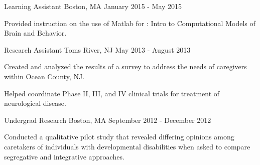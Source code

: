 \begin{cventries}
    {Learning Assistant}
    {Boston, MA}
    {January 2015 - May 2015}
    {\begin{cvitems}
        \item{Provided instruction on the use of Matlab for : Intro to Computational Models of
            Brain and Behavior.}
    \end{cvitems}}
    \vspace*{0.2cm}
    
    {Research Assistant}
    {Toms River, NJ}
    {May 2013 - August 2013}
    {\begin{cvitems}
        \item{Created and analyzed the results of a 
            {survey} to address the needs of caregivers within Ocean County,
            NJ.\vspace*{0.1cm}}
        \item{Helped coordinate Phase II, III, and IV clinical trials for treatment of
            neurological disease.}
    \end{cvitems}}
    \vspace*{0.2cm}
    
    {Undergrad Research}
    {Boston, MA}
    {September 2012 - December 2012}
    {\begin{cvitems}
        \item{Conducted a qualitative 
            {pilot study} that revealed differing opinions among caretakers of
            individuals with developmental disabilities when asked to compare
            segregative and integrative approaches.}
    \end{cvitems}}

\vspace*{-0.2cm}
\end{cventries}
